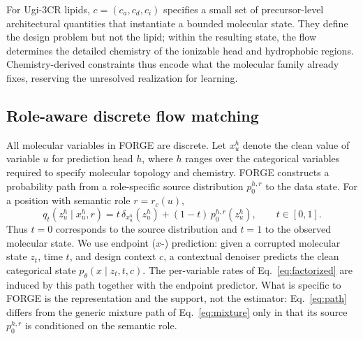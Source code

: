 \documentclass{article}
\begin{document}
For Ugi-3CR lipids, $c = (c_a, c_d, c_i)$ specifies a small set of precursor-level architectural
quantities that instantiate a bounded molecular state. They define the design problem but not the
lipid; within the resulting state, the flow determines the detailed chemistry of the ionizable head
and hydrophobic regions. Chemistry-derived constraints thus encode what the molecular family already
fixes, reserving the unresolved realization for learning.

\subsection{Role-aware discrete flow matching}
\label{sec:flow}
All molecular variables in FORGE are discrete. Let $x_u^h$ denote the clean value of variable $u$ for
prediction head $h$, where $h$ ranges over the categorical variables required to specify molecular
topology and chemistry. FORGE constructs a probability path from a role-specific source distribution
$p_0^{h,r}$ to the data state. For a position with semantic role $r = r_c(u)$,
%
\begin{equation}
\label{eq:path}
q_t\!\left(z_u^h \mid x_u^h, r\right)
= t\, \delta_{x_u^h}\!\left(z_u^h\right)
+ (1 - t)\, p_0^{h,r}\!\left(z_u^h\right),
\qquad t \in [0, 1].
\end{equation}
%
Thus $t = 0$ corresponds to the source distribution and $t = 1$ to the observed molecular state. We
use endpoint ($x$-) prediction: given a corrupted molecular state $z_t$, time $t$, and design context
$c$, a contextual denoiser predicts the clean categorical state $p_\theta(x \mid z_t, t, c)$. The
per-variable rates of Eq.~\eqref{eq:factorized} are induced by this path together with the endpoint
predictor. What is specific to FORGE is the representation and the support, not the estimator:
Eq.~\eqref{eq:path} differs from the generic mixture path of Eq.~\eqref{eq:mixture} only in that its
source $p_0^{h,r}$ is conditioned on the semantic role.
\end{document}

